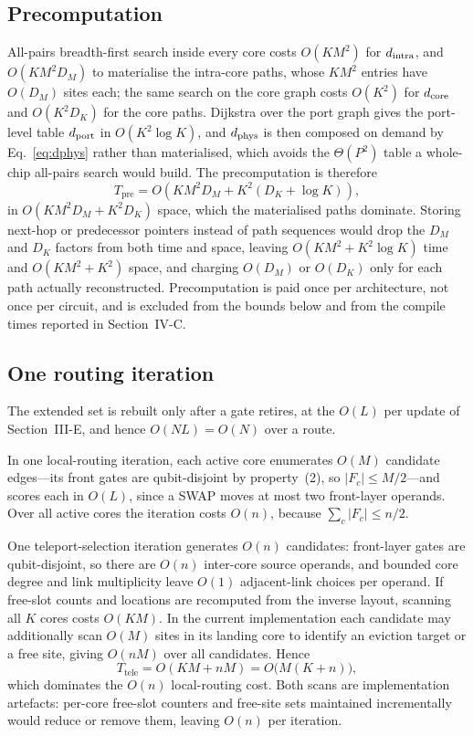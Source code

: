 \subsection{Precomputation}
\label{app:complexity_pre}

All-pairs breadth-first search inside every core costs $O(KM^2)$ for
$d_{\mathrm{intra}}$, and $O(KM^2D_M)$ to materialise the intra-core paths, whose $KM^2$
entries have $O(D_M)$ sites each; the same search on the core graph costs
$O(K^2)$ for $d_{\mathrm{core}}$ and $O(K^2D_K)$ for the core paths.  Dijkstra over the
port graph gives the port-level table $d_{\mathrm{port}}$ in $O(K^2\log K)$, and $d_{\mathrm{phys}}$
is then composed on demand by Eq.~\eqref{eq:dphys} rather than materialised,
which avoids the $\Theta(P^2)$ table a whole-chip all-pairs search would build.
The precomputation is therefore
\begin{equation}
T_{\mathrm{pre}}=O\!\left(KM^2D_M+K^2(D_K+\log K)\right),
\label{eq:app_precompute}
\end{equation}
in $O(KM^2D_M+K^2D_K)$ space, which the materialised paths dominate.  Storing
next-hop or predecessor pointers instead of path sequences would drop the
$D_M$ and $D_K$ factors from both time and space, leaving
$O(KM^2+K^2\log K)$ time and $O(KM^2+K^2)$ space, and charging $O(D_M)$ or
$O(D_K)$ only for each path actually reconstructed.  Precomputation is paid
once per architecture, not once per circuit, and is excluded from the bounds
below and from the compile times reported in Section~IV-C.

\subsection{One routing iteration}
\label{app:complexity_iter}

The extended set is rebuilt only after a gate retires, at the $O(L)$ per
update of Section~III-E, and hence $O(NL)=O(N)$ over a route.

In one local-routing iteration, each active core enumerates $O(M)$ candidate
edges---its front gates are qubit-disjoint by property~(2), so
$|F_c|\le M/2$---and scores each in $O(L)$, since a SWAP moves at most two
front-layer operands.  Over all active cores the iteration costs $O(n)$,
because $\sum_c|F_c|\le n/2$.

One teleport-selection iteration generates $O(n)$ candidates: front-layer
gates are qubit-disjoint, so there are $O(n)$ inter-core source operands, and
bounded core degree and link multiplicity leave $O(1)$ adjacent-link choices
per operand.  If free-slot counts and locations are recomputed from the
inverse layout, scanning all $K$ cores costs $O(KM)$.  In the current
implementation each candidate may additionally scan $O(M)$ sites in its
landing core to identify an eviction target or a free site, giving $O(nM)$
over all candidates.  Hence
\begin{equation}
T_{\mathrm{tele}} = O(KM+nM) = O\bigl(M(K+n)\bigr),
\label{eq:app_tele}
\end{equation}
which dominates the $O(n)$ local-routing cost.  Both scans are implementation
artefacts: per-core free-slot counters and free-site sets maintained
incrementally would reduce or remove them, leaving $O(n)$ per iteration.

